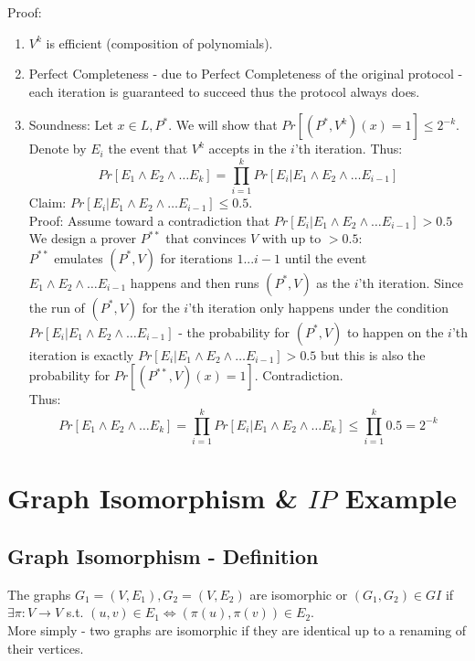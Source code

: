 Proof:
\begin{enumerate}
    \item $V^k$ is efficient  (composition of polynomials).
    \item Perfect Completeness - due to Perfect  Completeness of the original protocol - each iteration is guaranteed to succeed thus the protocol always does.
    \item Soundness: Let $x\in L, P^*$. We will show that $Pr[(P^*, V^k)(x)=1]\leq 2^{-k}$.
    Denote by $E_i$ the event that $V^k$ accepts in the $i$'th iteration. Thus:
    \[
        Pr[E_1\wedge E_2\wedge\dots E_k]=\prod_{i=1}^kPr[E_i|E_1\wedge E_2\wedge\dots E_{i-1}]
    \]
    Claim: $Pr[E_i|E_1\wedge E_2\wedge\dots E_{i-1}]\leq 0.5$.\\
    Proof: Assume toward a contradiction that $Pr[E_i|E_1\wedge E_2\wedge\dots E_{i-1}]>0.5$
    We design a prover $P^{**}$ that convinces $V$ with up to $>0.5$:\\
    $P^{**}$ emulates $(P^*, V)$ for iterations $1...i-1$ until the event
    $E_1\wedge E_2\wedge\dots E_{i-1}$ happens and then runs $(P^*,V)$ as the $i$'th iteration.
    Since the run of $(P^*,V)$ for the $i$'th iteration only happens under the condition
    $Pr[E_i|E_1\wedge E_2\wedge\dots E_{i-1}]$ - the probability for $(P^*,V)$
    to happen on the $i$'th iteration is exactly $Pr[E_i|E_1\wedge E_2\wedge\dots E_{i-1}]>0.5$
    but this is also the probability for $Pr[(P^{**},V)(x)=1]$. Contradiction.\\
    
    Thus:
    \[
        Pr[E_1\wedge E_2\wedge\dots E_k]=\prod_{i=1}^kPr[E_i|E_1\wedge E_2\wedge\dots E_k]\leq \prod_{i=1}^k0.5=2^{-k}
    \]
\end{enumerate}

\section*{Graph Isomorphism \& $IP$ Example}
\subsection*{Graph Isomorphism - Definition}
The graphs $G_1=(V,E_1), G_2=(V,E_2)$ are isomorphic or $(G_1,G_2)\in GI$ if $\exists\pi:V\longrightarrow V$ s.t. $(u,v)\in E_1 \iff (\pi(u), \pi(v))\in E_2$.\\
More simply - two graphs are isomorphic if they are identical up to a renaming of their vertices.\\

